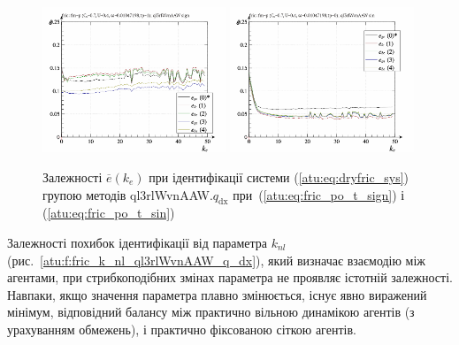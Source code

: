 \begin{figure}[htb!]
  \centerline{
    \includegraphics[width=0.49\textwidth]{p/cha/fric/ql3rlWvnAAW/fric_id-p_k_e_sign.png}
    \hfill
    \includegraphics[width=0.49\textwidth]{p/cha/fric/ql3rlWvnAAW/fric_id-p_k_e_sin.png}
  }
\caption{Залежності $ \overline{e} (k_e) $ при ідентифікації системи (\ref{atu:eq:dryfric_sys}) групою методів ql3rlWvnAAW.$q_\mathrm{dx} $ при~(\ref{atu:eq:fric_po_t_sign}) і (\ref{atu:eq:fric_po_t_sin})}
  \label{atu:f:fric_k_e_ql3rlWvnAAW_q_dx}
\end{figure}

Залежності похибок ідентифікації від параметра
$k_{nl} $ (рис.~\ref{atu:f:fric_k_nl_ql3rlWvnAAW_q_dx}), який визначає взаємодію між
агентами, при стрибкоподібних змінах параметра не проявляє
істотній залежності. Навпаки, якщо значення
параметра плавно змінюється, існує явно виражений мінімум, відповідний балансу між
практично вільною динамікою агентів (з урахуванням обмежень),
і практично фіксованою сіткою агентів.

